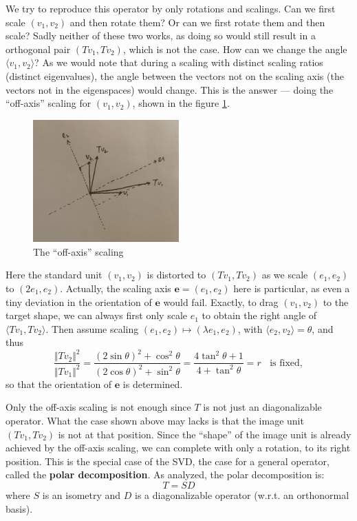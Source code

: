 \documentclass{article}
\begin{document}
We try to reproduce this operator by only rotations and scalings. Can we first scale $(v_1, v_2)$ and then rotate them? Or can we first rotate them and then scale? Sadly neither of these two works, as doing so would still result in a orthogonal pair $(Tv_1, Tv_2)$, which is not the case. How can we change the angle $\langle v_1, v_2\rangle$? As we would note that during a scaling with distinct scaling ratios (distinct eigenvalues), the angle between the vectors not on the scaling axis (the vectors not in the eigenspaces) would change. This is the answer — doing the ``off-axis'' scaling for $(v_1, v_2)$, shown in the figure \ref{fig:off_axis_scaling}.

\begin{figure}[H]
    \centering
    \includegraphics[width=0.5\textwidth]{figs_I2/2.jpg}
    \caption{The ``off-axis'' scaling}
    \label{fig:off_axis_scaling}
\end{figure}

Here the standard unit $(v_1, v_2)$ is distorted to $(Tv_1, Tv_2)$ as we scale $(e_1, e_2)$ to $(2e_1, e_2)$. Actually, the scaling axis $\pmb{e} = (e_1, e_2)$ here is particular, as even a tiny deviation in the orientation of $\pmb{e}$ would fail. Exactly, to drag $(v_1, v_2)$ to the target shape, we can always first only scale $e_1$ to obtain the right angle of $\langle Tv_1, Tv_2\rangle$. Then assume scaling $(e_1, e_2)\mapsto (\lambda e_1, e_2)$, with $\langle e_2, v_2 \rangle = \theta$, and thus 
$$ \frac{\Vert Tv_2 \Vert ^2}{\Vert Tv_1 \Vert ^2} = \frac{(2\sin\theta)^2 + \cos^2\theta}{(2\cos\theta)^2 + \sin^2\theta} = \frac{4\tan^2\theta+1}{4+\tan^2\theta} = r \;\;\text{ is fixed}, $$
so that the orientation of $\pmb{e}$ is determined.

Only the off-axis scaling is not enough since $T$ is not just an diagonalizable operator. What the case shown above may lacks is that the image unit $(Tv_1, Tv_2)$ is not at that position. Since the ``shape'' of the image unit is already achieved by the off-axis scaling, we can complete with only a rotation, to its right position. This is the special case of the SVD, the case for a general operator, called the \textbf{polar decomposition}. As analyzed, the polar decomposition is:
$$ T = SD $$
where $S$ is an isometry and $D$ is a diagonalizable operator (w.r.t. an orthonormal basis). 
\end{document}
